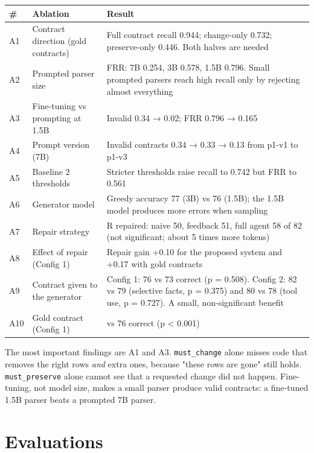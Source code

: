 \documentclass[11pt]{article}
\begin{document}
\begin{table}[!tp]
\centering\footnotesize\setlength{\tabcolsep}{3pt}\renewcommand{\arraystretch}{1.1}
\begin{tabularx}{\textwidth}{l>{\raggedright\arraybackslash}X>{\raggedright\arraybackslash}X}
\toprule
\textbf{\#} & \textbf{Ablation} & \textbf{Result} \\
\midrule
A1 & Contract direction (gold contracts) & Full contract recall 0.944; change-only 0.732; preserve-only 0.446. Both halves are needed \\
A2 & Prompted parser size & FRR: 7B 0.254, 3B 0.578, 1.5B 0.796. Small prompted parsers reach high recall only by rejecting almost everything \\
A3 & Fine-tuning vs prompting at 1.5B & Invalid 0.34 → 0.02; FRR 0.796 → 0.165 \\
A4 & Prompt version (7B) & Invalid contracts 0.34 → 0.33 → 0.13 from p1-v1 to p1-v3 \\
A5 & Baseline 2 thresholds & Stricter thresholds raise recall to 0.742 but FRR to 0.561 \\
A6 & Generator model & Greedy accuracy 77 (3B) vs 76 (1.5B); the 1.5B model produces more errors when sampling \\
A7 & Repair strategy & R repaired: naive 50, feedback 51, full agent 58 of 82 (not significant; about 5 times more tokens) \\
A8 & Effect of repair (Config 1) & Repair gain +0.10 for the proposed system and +0.17 with gold contracts \\
A9 & Contract given to the generator & Config 1: 76 vs 73 correct (p = 0.508). Config 2: 82 vs 79 (selective facts, p = 0.375) and 80 vs 78 (tool use, p = 0.727). A small, non-significant benefit \\
A10 & Gold contract (Config 1) & 94 vs 76 correct (p < 0.001) \\
\bottomrule
\end{tabularx}
\end{table}

The most important findings are A1 and A3.
\texttt{must\_\allowbreak{}change} alone misses code that removes the
right rows \emph{and} extra ones, because "these rows are gone" still
holds. \texttt{must\_\allowbreak{}preserve} alone cannot see that a
requested change did not happen. Fine-tuning, not model size, makes a
small parser produce valid contracts: a fine-tuned 1.5B parser beats a
prompted 7B parser.

\section{Evaluations}
\end{document}
